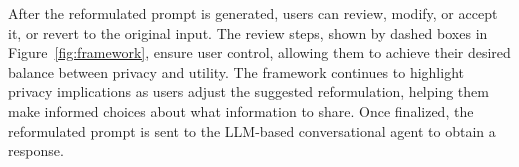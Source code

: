 After the reformulated prompt is generated, users can review, modify, or accept it, or revert to the original input. The review steps, shown by dashed boxes in Figure~\ref{fig:framework}, ensure user control, allowing them to achieve their desired balance between privacy and utility. The framework continues to highlight privacy implications as users adjust the suggested reformulation, helping them make informed choices about what information to share. Once finalized, the reformulated prompt is sent to the LLM-based conversational agent to obtain a response.


